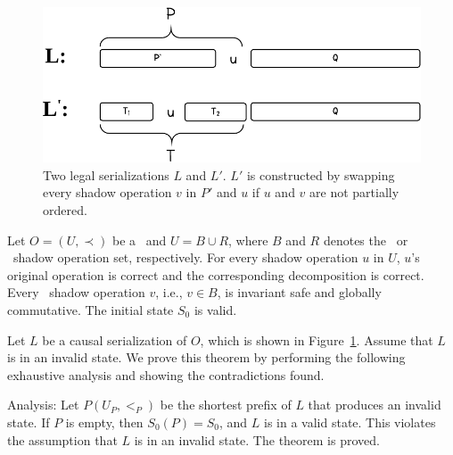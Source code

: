 \fi


\begin{figure}[!t]
\centering
\includegraphics[width=0.76\columnwidth]{figures/redblue/legal_serial_order_construction.pdf}
\caption{Two legal serializations $L$ and $L'$. $L'$ is constructed by
swapping every shadow operation $v$ in $P'$ and $u$ if $u$ and $v$ are not partially ordered.}
\label{fig:invpreserve_example}
\end{figure}


 Let $O=(U,\prec)$ be a \RBo\ and $U=B
  \cup R$, where $B$ and $R$ denotes the \blue\ or \red\ shadow operation set, 
respectively. For every shadow operation $u$ in $U$, $u$'s original operation is correct
and the corresponding decomposition is correct. 
Every \blue\ shadow operation $v$, i.e., $v \in B$,
  is invariant safe and globally commutative. The initial state $S_0$ is valid. 	

Let $L$ be a causal serialization of $O$, which is shown in 
Figure~\ref{fig:invpreserve_example}. Assume that $L$ is in an invalid state.
We prove this theorem by performing the following exhaustive analysis
and showing the contradictions found. 

Analysis: Let $P(U_P, <_P)$ be the shortest prefix of $L$ that produces 
an invalid state. If $P$ is empty, 
then $S_0(P) = S_0$, and $L$ is in a valid state.
This violates the assumption that $L$ is in an invalid state. The theorem is proved.

